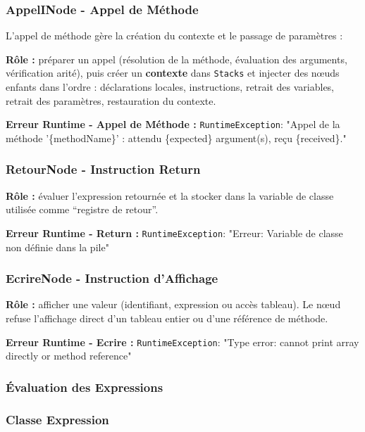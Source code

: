 \subsubsection{AppelINode - Appel de Méthode}

L'appel de méthode gère la création du contexte et le passage de paramètres :

\noindent\textbf{Rôle :} préparer un appel (résolution de la méthode, évaluation des arguments, vérification arité), puis créer un \textbf{contexte} dans \texttt{Stacks} et injecter des nœuds enfants dans l'ordre : déclarations locales, instructions, retrait des variables, retrait des paramètres, restauration du contexte.

\noindent\textbf{Erreur Runtime - Appel de Méthode :} \texttt{RuntimeException}: "Appel de la méthode '\{methodName\}' : attendu \{expected\} argument(s), reçu \{received\}."

\subsubsection{RetourNode - Instruction Return}

\noindent\textbf{Rôle :} évaluer l'expression retournée et la stocker dans la variable de classe utilisée comme ``registre de retour''.

\noindent\textbf{Erreur Runtime - Return :} \texttt{RuntimeException}: "Erreur: Variable de classe non définie dans la pile"

\subsubsection{EcrireNode - Instruction d'Affichage}

\noindent\textbf{Rôle :} afficher une valeur (identifiant, expression ou accès tableau). Le nœud refuse l'affichage direct d'un tableau entier ou d'une référence de méthode.

\noindent\textbf{Erreur Runtime - Ecrire :} \texttt{RuntimeException}: "Type error: cannot print array directly or method reference"

\subsubsection{Évaluation des Expressions}

\subsubsection{Classe Expression}


